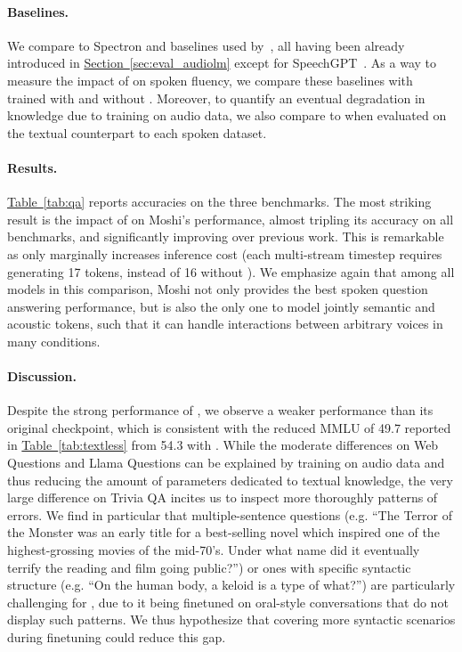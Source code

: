 \paragraph{Baselines.} 
We compare to Spectron and baselines used by~\citet{spectron}, all having been already introduced in \hyperref[sec:eval_audiolm]{Section~\ref{sec:eval_audiolm}} except for SpeechGPT~\citep{zhang2024speechgpt}. As a way to measure the impact of \interleaving{} on spoken fluency, we compare these baselines with \ours{}  trained with and without \interleaving{}. Moreover, to quantify an eventual degradation in knowledge due to training on audio data, we also compare to \helium{} when evaluated on the textual counterpart to each spoken dataset.
\paragraph{Results.} \hyperref[tab:qa]{Table~\ref{tab:qa}} reports accuracies on the three benchmarks. The most striking result is the impact of \interleaving{} on Moshi's performance, almost tripling its accuracy on all benchmarks, and significantly improving over previous work. This is remarkable as \interleaving{} only marginally increases inference cost (each multi-stream timestep requires generating 17 tokens, instead of 16 without \interleaving{}). We emphasize again that among all models in this comparison, Moshi not only provides the best spoken question answering performance, but is also the only one to model jointly semantic and acoustic tokens, such that it can handle interactions between arbitrary voices in many conditions.
\paragraph{Discussion.} Despite the strong performance of \ours{}, we observe a weaker performance than its original \helium{} checkpoint, which is consistent with the reduced MMLU of 49.7 reported in \hyperref[tab:textless]{Table~\ref{tab:textless}} from 54.3 with \helium{}. While the moderate differences on Web Questions and Llama Questions can be explained by training on audio data and thus reducing the amount of parameters dedicated to textual knowledge, the very large difference on Trivia QA incites us to inspect more thoroughly patterns of errors. We find in particular that multiple-sentence questions (e.g. ``The Terror of the Monster was an early title for a best-selling novel which inspired one of the highest-grossing movies of the mid-70's. Under what name did it eventually terrify the reading and film going public?'') or ones with specific syntactic structure (e.g. ``On the human body, a keloid is a type of what?'') are particularly challenging for \ours{}, due to it being finetuned on oral-style conversations that do not display such patterns. We thus hypothesize that covering more syntactic scenarios during finetuning could reduce this gap.

